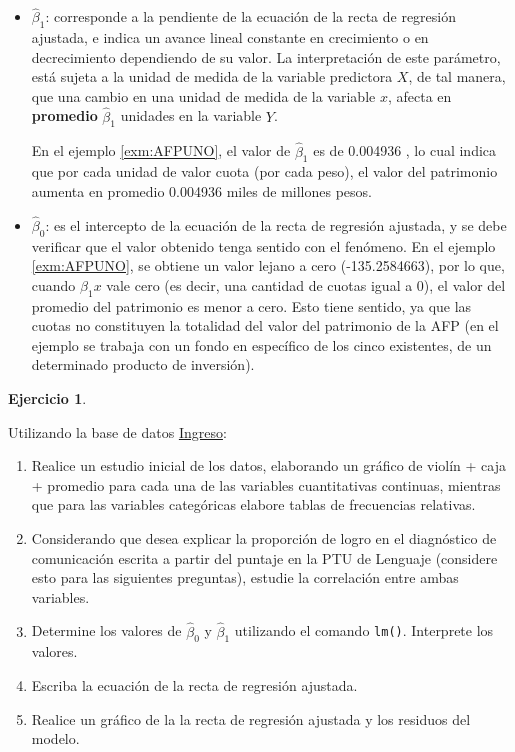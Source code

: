 \documentclass[
  11pt,
]{book}
\providecommand{\tightlist}{%
  \setlength{\itemsep}{0pt}\setlength{\parskip}{0pt}}
\theoremstyle{definition}
\theoremstyle{definition}
\theoremstyle{definition}
\newtheorem{exercise}{Ejercicio}[chapter]
\theoremstyle{definition}
\theoremstyle{remark}
\begin{document}
\begin{itemize}
\item
  \(\widehat{\beta}_1\): corresponde a la pendiente de la ecuación de la recta de regresión ajustada, e indica un avance lineal constante en crecimiento o en decrecimiento dependiendo de su valor. La interpretación de este parámetro, está sujeta a la unidad de medida de la variable predictora \(X\), de tal manera, que una cambio en una unidad de medida de la variable \(x\), afecta en \textbf{promedio} \(\widehat{\beta}_1\) unidades en la variable \(Y\).

  En el ejemplo \ref{exm:AFPUNO}, el valor de \(\widehat{\beta}_1\) es de 0.004936 , lo cual indica que por cada unidad de valor cuota (por cada peso), el valor del patrimonio aumenta en promedio 0.004936 miles de millones pesos.
\item
  \(\widehat{\beta}_0\): es el intercepto de la ecuación de la recta de regresión ajustada, y se debe verificar que el valor obtenido tenga sentido con el fenómeno. En el ejemplo \ref{exm:AFPUNO}, se obtiene un valor lejano a cero (-135.2584663), por lo que, cuando \(\beta_1x\) vale cero (es decir, una cantidad de cuotas igual a 0), el valor del promedio del patrimonio es menor a cero. Esto tiene sentido, ya que las cuotas no constituyen la totalidad del valor del patrimonio de la AFP (en el ejemplo se trabaja con un fondo en específico de los cinco existentes, de un determinado producto de inversión).
\end{itemize}

\begin{exercise}
\protect\hypertarget{exr:ingreso}{}\label{exr:ingreso}

Utilizando la base de datos \hyperref[Ingreso]{Ingreso}:

\begin{enumerate}
\def\labelenumi{\arabic{enumi}.}
\tightlist
\item
  Realice un estudio inicial de los datos, elaborando un gráfico de violín + caja + promedio para cada una de las variables cuantitativas continuas, mientras que para las variables categóricas elabore tablas de frecuencias relativas.
\item
  Considerando que desea explicar la proporción de logro en el diagnóstico de comunicación escrita a partir del puntaje en la PTU de Lenguaje (considere esto para las siguientes preguntas), estudie la correlación entre ambas variables.
\item
  Determine los valores de \(\widehat{\beta}_0\) y \(\widehat{\beta}_1\) utilizando el comando \texttt{lm()}. Interprete los valores.
\item
  Escriba la ecuación de la recta de regresión ajustada.
\item
  Realice un gráfico de la la recta de regresión ajustada y los residuos del modelo.
\end{enumerate}

\end{exercise}
\end{document}

